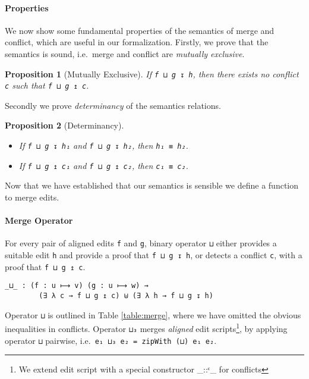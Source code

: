 \documentclass{sigplanconf}
\theoremstyle{plain}
\newtheorem{prop}{Proposition}
\begin{document}
\paragraph{Properties}
We now show some fundamental properties of the semantics of merge and
conflict, which are useful in our formalization.
Firstly, we prove that the semantics is sound, i.e.\ merge and
conflict are \emph{mutually exclusive}.
\begin{prop}[Mutually Exclusive]
  \label{prop:mutually-exclusive}
  If \texttt{f ⊔ g ↧ h}, then there exists no conflict \texttt{c} such
  that \texttt{f ⊔ g ↥ c}.
\end{prop}
Secondly we prove \emph{determinancy} of the semantics relations.
\begin{prop}[Determinancy]
\mbox{}
\label{prop:determinancy}
\begin{itemize}
\item If \texttt{f ⊔ g ↧ h₁} and \texttt{f ⊔ g ↧ h₂}, then \texttt{h₁
    ≡ h₂}.
%
\item  If \texttt{f ⊔ g ↥ c₁} and \texttt{f ⊔ g ↥ c₂}, then \texttt{c₁ ≡ c₂}.
\end{itemize}
\end{prop}
Now that we have established that our semantics is sensible we define
a function to merge edits.

\paragraph{Merge Operator}
For every pair of aligned edits \texttt{f} and \texttt{g}, binary
operator \texttt{⊔} either provides a suitable edit \texttt{h} and
provide a proof that \texttt{f ⊔ g ↧ h}, or detects a conflict
\texttt{c}, with a proof that \texttt{f ⊔ g ↥ c}.
        
\begin{verbatim}
_⊔_ : (f : u ⟼ v) (g : u ⟼ w) →
        (∃ λ c → f ⊔ g ↥ c) ⊎ (∃ λ h → f ⊔ g ↧ h)
\end{verbatim}
Operator \texttt{⊔} is outlined in Table \ref{table:merge}, where we
have omitted the obvious inequalities in conflicts.
%
Operator \texttt{⊔₃} merges \emph{aligned} edit scripts\footnote{We
  extend edit script with a special constructor \_::ᶜ\_ for
  conflicts}, by applying operator \texttt{⊔} pairwise, i.e.\
\texttt{e₁ ⊔₃ e₂ = zipWith (⊔) e₁ e₂}.
 
%
\end{document}
